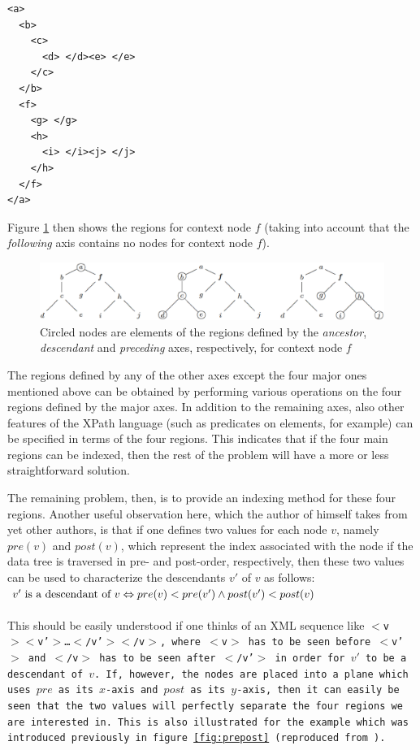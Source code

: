 \documentclass[a4paper,10pt]{article}
\begin{document}
\begin{verbatim}
<a>
  <b>
    <c>
      <d> </d><e> </e>
    </c>
  </b>
  <f>
    <g> </g>
    <h>
      <i> </i><j> </j>
    </h>
  </f>
</a>
\end{verbatim}

Figure \ref{fig:regions} then shows the regions for context node $f$ (taking into account that the
\textit{following} axis contains no nodes for context node $f$).

\begin{figure}[ht]
\begin{center}
\includegraphics[width=\linewidth]{img/regions.png}
\end{center}
\caption{Circled nodes are elements of the regions defined by the \textit{ancestor}, \textit{descendant} and
\textit{preceding} axes, respectively, for context node $f$}
\label{fig:regions}
\end{figure}

The regions defined by any of the other axes except the four major ones mentioned above can
be obtained by performing various operations on the four regions defined by the major axes. In
addition to the remaining axes, also other features of the XPath language (such as predicates
on elements, for example) can be specified in terms of the four regions. This indicates that if
the four main regions can be indexed, then the rest of the problem will have a more or less
straightforward solution.

The remaining problem, then, is to provide an indexing method for these four regions. Another
useful observation here, which the author of \cite{gru02} himself takes from yet other authors,
is that if one defines two values for each node $v$, namely $pre(v)$ and $post(v)$, which represent
the index associated with the node if the data tree is traversed in pre- and post-order, respectively,
then these two values can be used to characterize the descendants $v'$ of $v$ as follows:\\

\begin{math}
v'\textmd{ is a descendant of }v
\Leftrightarrow
pre(v) < pre(v')\wedge post(v') < post(v)
\end{math}\\
\\
\indent{}This should be easily understood if one thinks of an XML sequence like
\tt $<$v$><$v'$>$\ldots$<$/v'$><$/v$>$\normalfont, where $<$v$>$ has to be seen before
$<$v'$>$ and $<$/v$>$ has to be seen after $<$/v'$>$ in order for $v'$ to be a descendant of
$v$. If, however, the nodes are placed into a plane which uses $pre$ as its $x$-axis and $post$
as its $y$-axis, then it can easily be seen that the two values will perfectly separate the four
regions we are interested in. This is also illustrated for the example which was introduced previously
in figure \ref{fig:prepost} (reproduced from \cite{gru02}).
\end{document}
